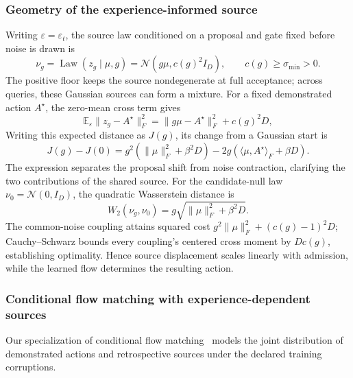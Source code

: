 \subsubsection{Geometry of the experience-informed source}
\label{app:source_geometry}

Writing $\varepsilon=\varepsilon_t$, the source law conditioned on a proposal and gate fixed before noise is drawn is
\begin{equation}
 \nu_g=\operatorname{Law}(z_g\mid\mu,g)=\mathcal N(g\mu,c(g)^2I_D),\qquad
 c(g)\geq\sigma_{\min}>0.
 \label{eq:source_law}
\end{equation}
The positive floor keeps the source nondegenerate at full acceptance; across queries, these Gaussian sources can form a mixture.
For a fixed demonstrated action $A^\star$, the zero-mean cross term gives
\begin{equation}
 \mathbb E_\varepsilon\|z_g-A^\star\|_F^2
 =\|g\mu-A^\star\|_F^2+c(g)^2D,
 \label{eq:geometry}
\end{equation}
Writing this expected distance as $J(g)$, its change from a Gaussian start is
\begin{equation}
 J(g)-J(0)=g^2(\|\mu\|_F^2+\beta^2D)
 -2g(\langle\mu,A^\star\rangle_F+\beta D).
 \label{eq:source_distance_difference}
\end{equation}
The expression separates the proposal shift from noise contraction, clarifying the two contributions of the shared source.
For the candidate-null law $\nu_0=\mathcal N(0,I_D)$, the quadratic Wasserstein distance is
\begin{equation}
 W_2(\nu_g,\nu_0)=g\sqrt{\|\mu\|_F^2+\beta^2D}.
 \label{eq:source_wasserstein}
\end{equation}
The common-noise coupling attains squared cost $g^2\|\mu\|_F^2+(c(g)-1)^2D$; Cauchy--Schwarz bounds every coupling's centered cross moment by $Dc(g)$, establishing optimality.
Hence source displacement scales linearly with admission, while the learned flow determines the resulting action.

\subsubsection{Conditional flow matching with experience-dependent sources}
\label{app:flow_proof}

Our specialization of conditional flow matching~\citep{lipman2023flowmatching,liu2023rectifiedflow} models the joint distribution of demonstrated actions and retrospective sources under the declared training corruptions.

